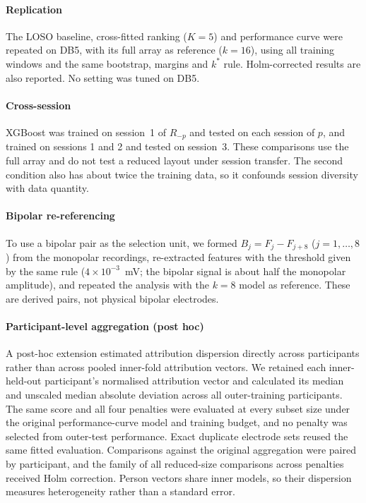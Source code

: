 \paragraph{Replication} The LOSO baseline, cross-fitted ranking ($K = 5$) and performance curve were repeated on DB5, with its full array as reference ($k = 16$), using all training windows and the same bootstrap, margins and $k^*$ rule. Holm-corrected results are also reported. No setting was tuned on DB5.

\paragraph{Cross-session} XGBoost was trained on session~1 of $R_{-p}$ and tested on each session of $p$, and trained on sessions 1 and 2 and tested on session~3. These comparisons use the full array and do not test a reduced layout under session transfer. The second condition also has about twice the training data, so it confounds session diversity with data quantity.

\paragraph{Bipolar re-referencing} To use a bipolar pair as the selection unit, we formed $B_j = F_j - F_{j+8}$ ($j = 1, \ldots, 8$) from the monopolar recordings, re-extracted features with the threshold given by the same rule ($4 \times 10^{-3}$~mV; the bipolar signal is about half the monopolar amplitude), and repeated the analysis with the $k = 8$ model as reference. These are derived pairs, not physical bipolar electrodes.

\paragraph{Participant-level aggregation (post hoc)} A post-hoc extension estimated attribution dispersion directly across participants rather than across pooled inner-fold attribution vectors. We retained each inner-held-out participant's normalised attribution vector and calculated its median and unscaled median absolute deviation across all outer-training participants. The same score and all four penalties were evaluated at every subset size under the original performance-curve model and training budget, and no penalty was selected from outer-test performance. Exact duplicate electrode sets reused the same fitted evaluation. Comparisons against the original aggregation were paired by participant, and the family of all reduced-size comparisons across penalties received Holm correction. Person vectors share inner models, so their dispersion measures heterogeneity rather than a standard error.

